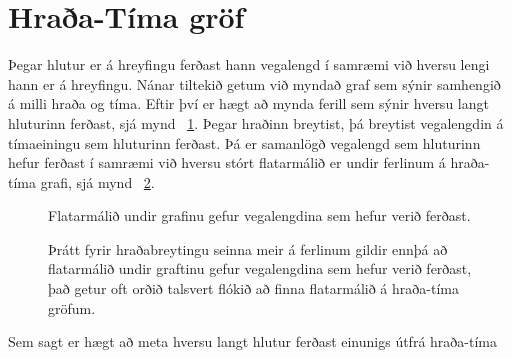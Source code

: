 \section{Hraða-Tíma gröf}
\label{sec:motion:speedtime}
Þegar hlutur er á hreyfingu ferðast hann vegalengd í samræmi við hversu
lengi hann er á hreyfingu. Nánar tiltekið getum við myndað graf
sem sýnir samhengið á milli hraða og tíma. Eftir því er hægt að mynda ferill
sem sýnir hversu langt hluturinn ferðast, sjá mynd 
~\ref{motion1d:fig:speedtimearea}.
Þegar hraðinn breytist, þá breytist vegalengdin á tímaeiningu sem hluturinn
ferðast. Þá er samanlögð vegalengd sem hluturinn hefur ferðast í samræmi við
hversu stórt flatarmálið er undir ferlinum á hraða-tíma grafi, sjá mynd
~\ref{motion1d:fig:speedtimeareanonlinear}.
\begin{figure}[!ht]
	\label{motion1d:fig:speedtimearea}
	\centering
	\caption{Flatarmálið undir grafinu gefur vegalengdina sem hefur verið ferðast.}
\end{figure}
%
\begin{figure}[!ht]
	\label{motion1d:fig:speedtimeareanonlinear}
	\centering
	\caption{Þrátt fyrir hraðabreytingu seinna meir á ferlinum gildir ennþá að
		flatarmálið undir graftinu gefur vegalengdina sem hefur verið ferðast,
		það getur oft orðið talsvert flókið að finna flatarmálið á hraða-tíma
		gröfum.}
\end{figure}
%
Sem sagt er hægt að meta hversu langt hlutur ferðast einunigs útfrá hraða-tíma
